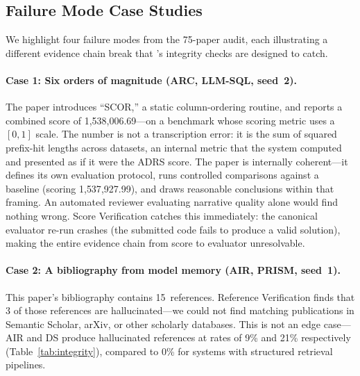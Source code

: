 \subsection{Failure Mode Case Studies}
\label{sec:exp:failures}

We highlight four failure modes from the 75-paper audit, each illustrating a different evidence chain break that \coeaudit{}'s integrity checks are designed to catch.

\paragraph{Case 1: Six orders of magnitude (ARC, LLM-SQL, seed~2).}
The paper introduces ``SCOR,'' a static column-ordering routine, and reports a combined score of 1{,}538{,}006.69---on a benchmark whose scoring metric uses a $[0, 1]$ scale.
The number is not a transcription error: it is the sum of squared prefix-hit lengths across datasets, an internal metric that the system computed and presented as if it were the ADRS score.
The paper is internally coherent---it defines its own evaluation protocol, runs controlled comparisons against a baseline (scoring 1{,}537{,}927.99), and draws reasonable conclusions within that framing.
An automated reviewer evaluating narrative quality alone would find nothing wrong.
Score Verification catches this immediately: the canonical evaluator re-run crashes (the submitted code fails to produce a valid solution), making the entire evidence chain from score to evaluator unresolvable.

\paragraph{Case 2: A bibliography from model memory (AIR, PRISM, seed~1).}
This paper's bibliography contains 15~references.
Reference Verification finds that 3 of those references are hallucinated---we could not find matching publications in Semantic Scholar, arXiv, or other scholarly databases.
This is not an edge case---AIR and DS produce hallucinated references at rates of 9\% and 21\% respectively (Table~\ref{tab:integrity}), compared to 0\% for systems with structured retrieval pipelines.

